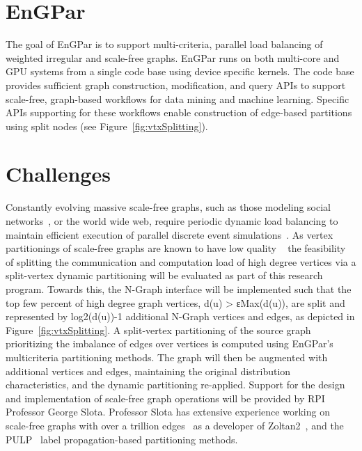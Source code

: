 \documentclass{article}
\begin{document}
\section{EnGPar}

The goal of EnGPar is to support multi-criteria, parallel load balancing of
weighted irregular and scale-free graphs.
EnGPar runs on both multi-core and GPU systems from a single code base using
device specific kernels.
The code base provides sufficient graph construction, modification, and
query APIs to support scale-free, graph-based workflows for data mining and
machine learning.
Specific APIs supporting for these workflows enable construction of edge-based
partitions using split nodes (see Figure~\ref{fig:vtxSplitting}).

\section{Challenges}

Constantly evolving massive scale-free graphs, such as those modeling social
networks~\cite{twitter2010,kwak2010twitter}, or the world wide web, require
periodic dynamic load balancing to maintain efficient execution of parallel
discrete event simulations~\cite{carothers2002ross}.
As vertex partitionings of scale-free graphs are known to have low quality
~\cite{abou2006multilevel,lang2004finding,leskovec2009community,pienta2013parallel}
the feasibility of splitting the communication and computation load of high
degree vertices via a split-vertex dynamic partitioning will be evaluated as
part of this research program.
Towards this, the N-Graph interface will be implemented such
that the top few percent of high degree graph vertices, d(u) > εMax(d(u)), are
split and represented by log2(d(u))-1 additional N-Graph vertices and edges, as
depicted in Figure~\ref{fig:vtxSplitting}.
A split-vertex partitioning of the source graph prioritizing the imbalance of
edges over vertices is computed using EnGPar’s multicriteria partitioning
methods.
The graph will then be augmented with additional vertices and edges,
maintaining the original distribution characteristics, and the dynamic
partitioning re-applied.
Support for the design and implementation of scale-free graph operations will be
provided by RPI Professor George Slota.
Professor Slota has extensive experience working on scale-free graphs with over
a trillion edges~\cite{slota_ipdps2017} as a developer of Zoltan2~\cite{zoltan2}, and the
PULP~\cite{slota_ipdps2017} label propagation-based partitioning methods.
\end{document}
